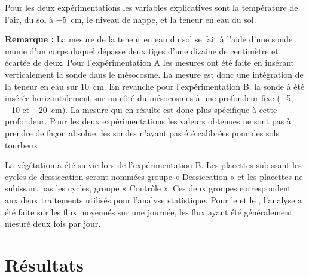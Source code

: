 Pour les deux expérimentations les variables explicatives sont la température de l'air, du sol à \SI{-5}{\centi\metre}, le niveau de nappe, et la teneur en eau du sol. 
\begin{center}
\begin{minipage}{.85\textwidth}
\setlength{\parindent}{-10pt}%
\onehalfspacing
\textbf{Remarque :} La mesure de la teneur en eau du sol se fait à l'aide d'une sonde munie d'un corps duquel dépasse deux tiges d'une dizaine de centimètre et écartée de deux. 
Pour l'expérimentation A les mesures ont été faite en insérant verticalement la sonde dans le mésocosme.
La mesure est donc une intégration de la teneur en eau sur \SI{10}{\centi\metre}.
En revanche pour l'expérimentation B, la sonde à été insérée horizontalement sur un côté du mésocosmes à une profondeur fixe (\num{-5}, \num{-10} et \SI{-20}{\centi\metre}).
La mesure qui en résulte est donc plus spécifique à cette profondeur.
Pour les deux expérimentations les valeurs obtenues ne sont pas à prendre de façon absolue, les sondes n'ayant pas été calibrées pour des sols tourbeux.
\end{minipage}
\end{center}
La végétation a été suivie lors de l'expérimentation B.
Les placettes subissant les cycles de dessiccation seront nommées groupe « Dessiccation » et les placettes ne subissant pas les cycles, groupe « Contrôle ».
Ces deux groupes correspondent aux deux traitements utilisés pour l'analyse statistique.
Pour le \coo et le \chh, l'analyse a été faite sur les flux moyennés sur une journée, les flux ayant été généralement mesuré deux fois par jour.






\section{Résultats}


